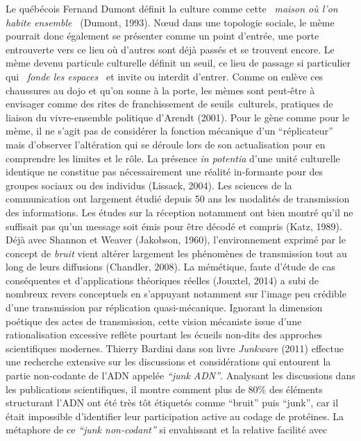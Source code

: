 Le qu\'eb\'ecois Fernand Dumont d\'efinit la culture comme cette \textit{{\guillemotleft}~maison o\`u l{\textquoteright}on habite ensemble~{\guillemotright} }(Dumont, 1993). N{\oe}ud dans une topologie sociale, le m\`eme pourrait donc \'egalement se pr\'esenter comme un point d{\textquoteright}entr\'ee, une porte entrouverte vers ce lieu o\`u d{\textquoteright}autres sont d\'ej\`a pass\'es et se trouvent encore. Le m\`eme devenu particule culturelle d\'efinit un seuil, ce lieu de passage si particulier qui \textit{{\guillemotleft}~fonde les espaces~{\guillemotright}} \cite{Bonnin2000} et invite ou interdit d{\textquoteright}entrer. Comme on enl\`eve ces chaussures au dojo et qu{\textquoteright}on sonne \`a la porte, les m\`emes sont peut-\^etre \`a envisager comme des rites de franchissement de seuils~culturels, pratiques de liaison du vivre-ensemble politique d{\textquoteright}Arendt (2001). Pour le g\`ene comme pour le m\`eme, il ne s{\textquoteright}agit pas de consid\'erer la fonction m\'ecanique d{\textquoteright}un {\textquotedblleft}r\'eplicateur{\textquotedblright} mais d{\textquoteright}observer l{\textquoteright}alt\'eration qui se d\'eroule lors de son actualisation pour en comprendre les limites et le r\^ole. La pr\'esence \textit{in potentia }d{\textquoteright}une unit\'e culturelle identique ne constitue pas n\'ecessairement une r\'ealit\'e in-formante pour des groupes sociaux ou des individus (Lissack, 2004). Les sciences de la communication ont largement \'etudi\'e depuis 50 ans les modalit\'es de transmission des informations. Les \'etudes sur la r\'eception notamment ont bien montr\'e qu{\textquoteright}il ne suffisait pas qu{\textquoteright}un message soit \'emis pour \^etre d\'ecod\'e et compris (Katz, 1989). D\'ej\`a avec Shannon et Weaver (Jakobson, 1960), l{\textquoteright}environnement exprim\'e par le concept de\textit{ bruit }vient alt\'erer largement les ph\'enom\`enes de transmission tout au long de leurs diffusions (Chandler, 2008). La m\'em\'etique, faute d{\textquoteright}\'etude de cas cons\'equentes et d{\textquoteright}applications th\'eoriques r\'eelles (Jouxtel, 2014) a subi de nombreux revers conceptuels en s{\textquoteright}appuyant notamment sur l{\textquoteright}image peu cr\'edible d{\textquoteright}une transmission par r\'eplication quasi-m\'ecanique. Ignorant la dimension po\'etique des actes de transmission, cette vision m\'ecaniste issue d{\textquoteright}une rationalisation excessive refl\`ete pourtant les \'ecueils non-dits des approches scientifiques modernes. Thierry Bardini dans son livre \textit{Junkware }(2011) effectue une recherche extensive sur les discussions et consid\'erations qui entourent la partie non-codante de l{\textquoteright}ADN appel\'ee \textit{{\textquotedblleft}junk ADN{\textquotedblright}}. Analysant les discussions dans les publications scientifiques, il montre comment plus de 80\% des \'el\'ements structurant l{\textquoteright}ADN ont \'et\'e tr\`es t\^ot \'etiquet\'es comme {\textquotedblleft}bruit{\textquotedblright} puis {\textquotedblleft}junk{\textquotedblright}, car il \'etait impossible d{\textquoteright}identifier leur participation active au codage de prot\'eines. La m\'etaphore de ce \textit{{\textquotedblleft}junk non-codant{\textquotedblright} }si envahissant et la relative facilit\'e avec 